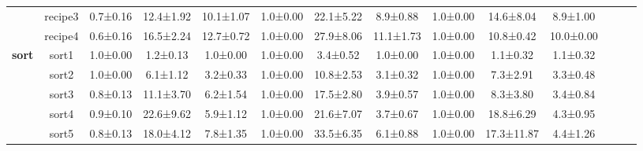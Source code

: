 \documentclass[11pt]{article}
\theoremstyle{plain}
\theoremstyle{remark}
\begin{document}
\begin{table}[t]
\begin{center}
\begin{small}
\begin{sc}
\begin{adjustbox}{width=1\textwidth}
\begin{tabular}{ccccccccccclll}
                          & \multicolumn{1}{c|}{recipe3} & 0.7±0.16  & 12.4±1.92  & \multicolumn{1}{c|}{10.1±1.07} & 1.0±0.00  & 22.1±5.22  & \multicolumn{1}{c|}{8.9±0.88}  & 1.0±0.00  & 14.6±8.04    & 8.9±1.00                       &                               &                                &                               \\
                          & \multicolumn{1}{c|}{recipe4} & 0.6±0.16  & 16.5±2.24  & \multicolumn{1}{c|}{12.7±0.72} & 1.0±0.00  & 27.9±8.06  & \multicolumn{1}{c|}{11.1±1.73} & 1.0±0.00  & 10.8±0.42    & 10.0±0.00                      &                               &                                &                               \\ \cline{1-11}
\multirow{5}{*}{\textbf{sort}}     & \multicolumn{1}{c|}{sort1}   & 1.0±0.00  & 1.2±0.13   & \multicolumn{1}{c|}{1.0±0.00}  & 1.0±0.00  & 3.4±0.52   & \multicolumn{1}{c|}{1.0±0.00}  & 1.0±0.00  & 1.1±0.32     & 1.1±0.32                       &                               &                                &                               \\
                          & \multicolumn{1}{c|}{sort2}   & 1.0±0.00  & 6.1±1.12   & \multicolumn{1}{c|}{3.2±0.33}  & 1.0±0.00  & 10.8±2.53  & \multicolumn{1}{c|}{3.1±0.32}  & 1.0±0.00  & 7.3±2.91     & 3.3±0.48                       &                               &                                &                               \\
                          & \multicolumn{1}{c|}{sort3}   & 0.8±0.13  & 11.1±3.70  & \multicolumn{1}{c|}{6.2±1.54}  & 1.0±0.00  & 17.5±2.80  & \multicolumn{1}{c|}{3.9±0.57}  & 1.0±0.00  & 8.3±3.80     & 3.4±0.84                       &                               &                                &                               \\
                          & \multicolumn{1}{c|}{sort4}   & 0.9±0.10  & 22.6±9.62  & \multicolumn{1}{c|}{5.9±1.12}  & 1.0±0.00  & 21.6±7.07  & \multicolumn{1}{c|}{3.7±0.67}  & 1.0±0.00  & 18.8±6.29    & 4.3±0.95                       &                               &                                &                               \\
                          & \multicolumn{1}{c|}{sort5}   & 0.8±0.13  & 18.0±4.12  & \multicolumn{1}{c|}{7.8±1.35}  & 1.0±0.00  & 33.5±6.35  & \multicolumn{1}{c|}{6.1±0.88}  & 1.0±0.00  & 17.3±11.87   & 4.4±1.26                       &                               &                                &                               \\ \cline{1-11}

\end{tabular}
\end{adjustbox}
\end{sc}
\end{small}
\end{center}
\end{table}
\end{document}
